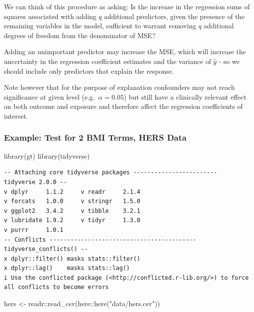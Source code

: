 \documentclass[
  letterpaper,
  DIV=11,
  numbers=noendperiod]{scrreport}
\newenvironment{Shaded}{\begin{snugshade}}{\end{snugshade}}
\newcommand{\FunctionTok}[1]{\textcolor[rgb]{0.28,0.35,0.67}{#1}}
\newcommand{\NormalTok}[1]{\textcolor[rgb]{0.00,0.23,0.31}{#1}}
\newcommand{\OtherTok}[1]{\textcolor[rgb]{0.00,0.23,0.31}{#1}}
\newcommand{\SpecialCharTok}[1]{\textcolor[rgb]{0.37,0.37,0.37}{#1}}
\newcommand{\StringTok}[1]{\textcolor[rgb]{0.13,0.47,0.30}{#1}}
\begin{document}
We can think of this procedure as asking: Is the increase in the
regression sums of squares associated with adding \(q\) additional
predictors, given the presence of the remaining variables in the model,
sufficient to warrant removing \(q\) additional degrees of freedom from
the denominator of MSE?

Adding an unimportant predictor may increase the MSE, which will
increase the uncertainty in the regression coefficient estimates and the
variance of \(\hat y\) - so we should include only predictors that
explain the response.

Note however that for the purpose of explanation confounders may not
reach significance at given level (e.g.~\(\alpha = 0.05\)) but still
have a clinically relevant effect on both outcome and exposure and
therefore affect the regression coefficients of interest.

\hypertarget{example-test-for-2-bmi-terms-hers-data}{%
\subsubsection{Example: Test for 2 BMI Terms, HERS
Data}\label{example-test-for-2-bmi-terms-hers-data}}

\begin{Shaded}
\begin{Highlighting}[]
\FunctionTok{library}\NormalTok{(gt)}
\FunctionTok{library}\NormalTok{(tidyverse)}
\end{Highlighting}
\end{Shaded}

\begin{verbatim}
-- Attaching core tidyverse packages ------------------------ tidyverse 2.0.0 --
v dplyr     1.1.2     v readr     2.1.4
v forcats   1.0.0     v stringr   1.5.0
v ggplot2   3.4.2     v tibble    3.2.1
v lubridate 1.9.2     v tidyr     1.3.0
v purrr     1.0.1     
-- Conflicts ------------------------------------------ tidyverse_conflicts() --
x dplyr::filter() masks stats::filter()
x dplyr::lag()    masks stats::lag()
i Use the conflicted package (<http://conflicted.r-lib.org/>) to force all conflicts to become errors
\end{verbatim}

\begin{Shaded}
\begin{Highlighting}[]
\NormalTok{hers }\OtherTok{\textless{}{-}}\NormalTok{ readr}\SpecialCharTok{::}\FunctionTok{read\_csv}\NormalTok{(here}\SpecialCharTok{::}\FunctionTok{here}\NormalTok{(}\StringTok{"data/hers.csv"}\NormalTok{))}
\end{Highlighting}
\end{Shaded}
\end{document}
